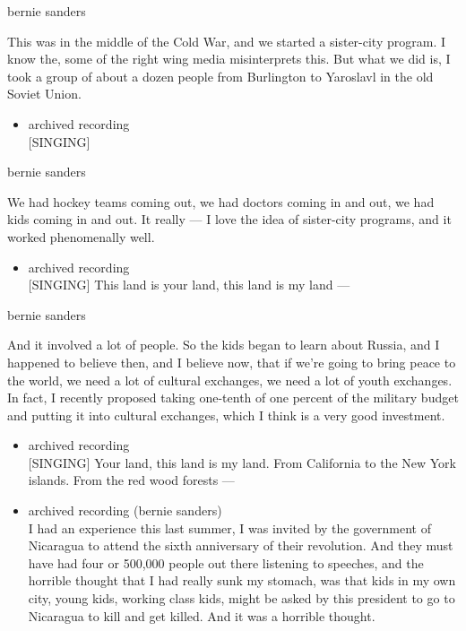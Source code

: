 bernie sanders

This was in the middle of the Cold War, and we started a sister-city
program. I know the, some of the right wing media misinterprets this.
But what we did is, I took a group of about a dozen people from
Burlington to Yaroslavl in the old Soviet Union.

\begin{itemize}
\tightlist
\item
  archived recording\\
  {[}SINGING{]}
\end{itemize}

bernie sanders

We had hockey teams coming out, we had doctors coming in and out, we had
kids coming in and out. It really --- I love the idea of sister-city
programs, and it worked phenomenally well.

\begin{itemize}
\tightlist
\item
  archived recording\\
  {[}SINGING{]} This land is your land, this land is my land ---
\end{itemize}

bernie sanders

And it involved a lot of people. So the kids began to learn about
Russia, and I happened to believe then, and I believe now, that if we're
going to bring peace to the world, we need a lot of cultural exchanges,
we need a lot of youth exchanges. In fact, I recently proposed taking
one-tenth of one percent of the military budget and putting it into
cultural exchanges, which I think is a very good investment.

\begin{itemize}
\item
  archived recording\\
  {[}SINGING{]} Your land, this land is my land. From California to the
  New York islands. From the red wood forests ---
\item
  archived recording (bernie sanders)\\
  I had an experience this last summer, I was invited by the government
  of Nicaragua to attend the sixth anniversary of their revolution. And
  they must have had four or 500,000 people out there listening to
  speeches, and the horrible thought that I had really sunk my stomach,
  was that kids in my own city, young kids, working class kids, might be
  asked by this president to go to Nicaragua to kill and get killed. And
  it was a horrible thought.
\end{itemize}

